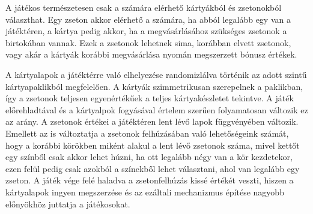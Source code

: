 A játékos természetesen csak a számára elérhető kártyákból és zsetonokból választhat. Egy zseton akkor elérhető a számára, ha abból legalább egy van a játéktéren, a kártya pedig akkor, ha a megvásárlásához szükséges zsetonok a birtokában vannak. Ezek a zsetonok lehetnek sima, korábban elvett zsetonok, vagy akár a kártyák korábbi megvásárlása nyomán megszerzett bónusz értékek.


A kártyalapok a játéktérre való elhelyezése randomizlálva történik az adott szintű kártyapaklikból megfelelően. A kártyák szimmetrikusan szerepelnek a paklikban, így a zsetonok teljesen egyenértékűek a teljes kártyakészletet tekintve. A játék előrehladtával és a kártyalpok fogyásával értelem szerűen folyamatosan változik ez az arány. A zsetonok értékei a játéktéren lent lévő lapok függvényében változik. Emellett az is változtatja a zsetonok felhúzásában való lehetőségeink számát, hogy a korábbi körökben miként alakul a lent lévő zsetonok száma, mivel kettőt egy színből csak akkor lehet húzni, ha ott legalább négy van a kör kezdetekor, ezen felül pedig csak azokból a színekből lehet választani, ahol van legalább egy zseton. A játék vége felé haladva a zsetonfelhúzás kissé értékét veszti, hiszen a kártyalapok ingyen megszerzése és az ezáltali mechanizmus építése nagyobb előnyökhöz juttatja a játékosokat.
